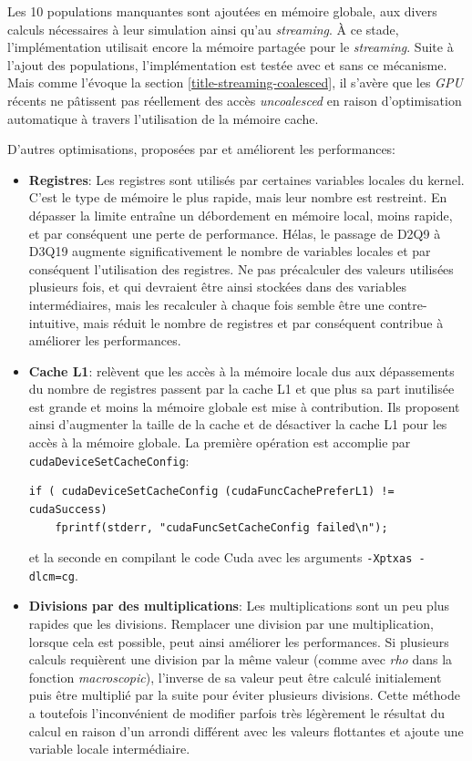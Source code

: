Les 10 populations manquantes sont ajoutées en mémoire globale, aux divers calculs nécessaires à leur simulation ainsi qu'au \textit{streaming}. À ce stade, l'implémentation utilisait encore la mémoire partagée pour le \textit{streaming}. Suite à l'ajout des populations, l'implémentation est testée avec et sans ce mécanisme. Mais comme l'évoque la section \ref{title-streaming-coalesced}, il s'avère que les \textit{GPU} récents ne pâtissent pas réellement des accès \textit{uncoalesced} en raison d'optimisation automatique à travers l'utilisation de la mémoire cache.

D'autres optimisations, proposées par \citet{januszewski_sailfish:_2014} et \citet{tran_performance_2017} améliorent les performances:
\begin{itemize}
\item \textbf{Registres}: Les registres sont utilisés par certaines variables locales du kernel. C'est le type de mémoire le plus rapide, mais leur nombre est restreint. En dépasser la limite entraîne un débordement en mémoire local, moins rapide, et par conséquent une perte de performance. Hélas, le passage de D2Q9 à D3Q19 augmente significativement le nombre de variables locales et par conséquent l'utilisation des registres. Ne pas précalculer des valeurs utilisées plusieurs fois, et qui devraient être ainsi stockées dans des variables intermédiaires, mais les recalculer à chaque fois semble être une  contre-intuitive, mais réduit le nombre de registres et par conséquent contribue à améliorer les performances.
\item \textbf{Cache L1}: \citet{januszewski_sailfish:_2014} relèvent que les accès à la mémoire locale dus aux dépassements du nombre de registres passent par la cache L1 et que plus sa part inutilisée est grande et moins la mémoire globale est mise à contribution. Ils proposent ainsi d'augmenter la taille de la cache et de désactiver la cache L1 pour les accès à la mémoire globale. La première opération est accomplie par \texttt{cudaDeviceSetCacheConfig}:
\begin{lstlisting}[numbers=none]
if ( cudaDeviceSetCacheConfig (cudaFuncCachePreferL1) != cudaSuccess)
	fprintf(stderr, "cudaFuncSetCacheConfig failed\n");
\end{lstlisting}
et la seconde en compilant le code Cuda avec les arguments \texttt{-Xptxas -dlcm=cg}.
\item \textbf{Divisions par des multiplications}: Les multiplications sont un peu plus rapides que les divisions. Remplacer une division par une multiplication, lorsque cela est possible, peut ainsi améliorer les performances. Si plusieurs calculs requièrent une division par la même valeur (comme avec \textit{rho} dans la fonction \textit{macroscopic}), l'inverse de sa valeur peut être calculé initialement puis être multiplié par la suite pour éviter plusieurs divisions. Cette méthode a toutefois l'inconvénient de modifier parfois très légèrement le résultat du calcul en raison d'un arrondi différent avec les valeurs flottantes et ajoute une variable locale intermédiaire.
\end{itemize}


